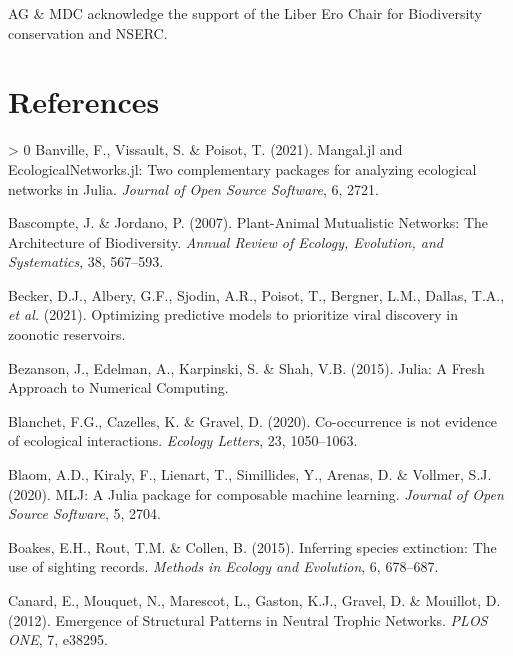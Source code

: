 \documentclass[11pt]{article}
\newlength{\cslhangindent}
\newenvironment{CSLReferences}[3] %
 {%
  \setlength{\parindent}{0pt}
  \ifodd #1 \everypar{\setlength{\hangindent}{\cslhangindent}}\ignorespaces\fi
  \ifnum #2 > 0
  \setlength{\parskip}{#2\baselineskip}
  \fi
 }%
 {}
\begin{document}
AG \& MDC acknowledge the support of the Liber Ero Chair for
Biodiversity conservation and NSERC.

\hypertarget{references}{%
\section*{References}\label{references}}

\hypertarget{refs}{}
\begin{CSLReferences}{1}{0}
\leavevmode\hypertarget{ref-Banville2021ManJl}{}%
Banville, F., Vissault, S. \& Poisot, T. (2021). Mangal.jl and
EcologicalNetworks.jl: Two complementary packages for analyzing
ecological networks in Julia. \emph{Journal of Open Source Software}, 6,
2721.

\leavevmode\hypertarget{ref-Bascompte2007PlaMut}{}%
Bascompte, J. \& Jordano, P. (2007). Plant-Animal Mutualistic Networks:
The Architecture of Biodiversity. \emph{Annual Review of Ecology,
Evolution, and Systematics}, 38, 567--593.

\leavevmode\hypertarget{ref-Becker2021OptPre}{}%
Becker, D.J., Albery, G.F., Sjodin, A.R., Poisot, T., Bergner, L.M.,
Dallas, T.A., \emph{et al.} (2021). Optimizing predictive models to
prioritize viral discovery in zoonotic reservoirs.

\leavevmode\hypertarget{ref-Bezanson2015JulFre}{}%
Bezanson, J., Edelman, A., Karpinski, S. \& Shah, V.B. (2015). Julia: A
Fresh Approach to Numerical Computing.

\leavevmode\hypertarget{ref-Blanchet2020CooNot}{}%
Blanchet, F.G., Cazelles, K. \& Gravel, D. (2020). Co-occurrence is not
evidence of ecological interactions. \emph{Ecology Letters}, 23,
1050--1063.

\leavevmode\hypertarget{ref-Blaom2020MljJul}{}%
Blaom, A.D., Kiraly, F., Lienart, T., Simillides, Y., Arenas, D. \&
Vollmer, S.J. (2020). MLJ: A Julia package for composable machine
learning. \emph{Journal of Open Source Software}, 5, 2704.

\leavevmode\hypertarget{ref-Boakes2015InfSpe}{}%
Boakes, E.H., Rout, T.M. \& Collen, B. (2015). Inferring species
extinction: The use of sighting records. \emph{Methods in Ecology and
Evolution}, 6, 678--687.

\leavevmode\hypertarget{ref-Canard2012EmeStr}{}%
Canard, E., Mouquet, N., Marescot, L., Gaston, K.J., Gravel, D. \&
Mouillot, D. (2012). Emergence of Structural Patterns in Neutral Trophic
Networks. \emph{PLOS ONE}, 7, e38295.


\end{CSLReferences}
\end{document}

